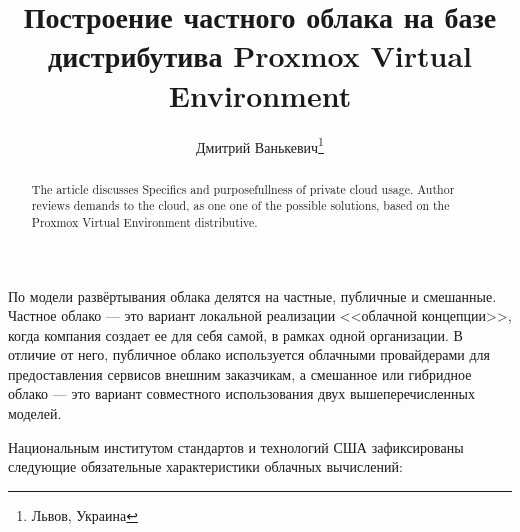 \documentclass[10pt, a5paper]{article}
\begin{document}
\title{Построение частного облака на базе дистрибутива Proxmox Virtual Environment}%

\author{Дмитрий Ванькевич\footnote{Львов, Украина}}
\maketitle

\begin{abstract}
The article discusses Specifics and purposefullness of private cloud usage. Author reviews demands to the cloud, as one one of the possible solutions, based on the Proxmox Virtual Environment distributive.
\end{abstract}


По модели развёртывания облака делятся на частные, публичные и смешанные.
Частное облако --- это вариант локальной реализации <<облачной концепции>>, когда компания создает ее для себя самой, в рамках одной организации. В отличие от него, публичное облако используется облачными провайдерами для предоставления сервисов внешним заказчикам, а смешанное или гибридное облако --- это вариант совместного использования двух вышеперечисленных моделей.

Национальным институтом стандартов и технологий США зафиксированы следующие обязательные характеристики облачных вычислений:
\end{document}
